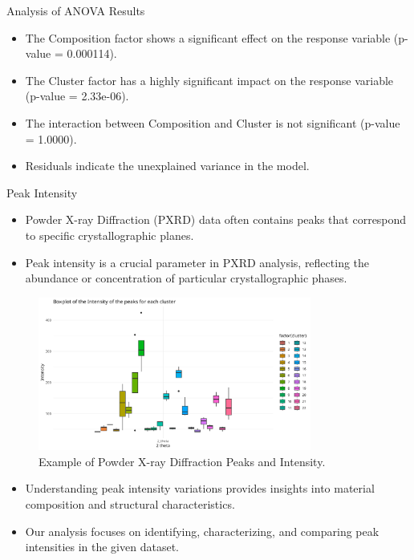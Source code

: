 \documentclass[aspectratio=169]{beamer}
\begin{document}
\begin{frame}{Analysis of ANOVA Results}
  \begin{itemize}
    \item The Composition factor shows a significant effect on the response variable (p-value = 0.000114).
    \item The Cluster factor has a highly significant impact on the response variable (p-value = 2.33e-06).
    \item The interaction between Composition and Cluster is not significant (p-value = 1.0000).
    \item Residuals indicate the unexplained variance in the model.
  \end{itemize}
\end{frame}


\begin{frame}{Peak Intensity}
    \begin{itemize}
        \item Powder X-ray Diffraction (PXRD) data often contains peaks that correspond to specific crystallographic planes.
        \item Peak intensity is a crucial parameter in PXRD analysis, reflecting the abundance or concentration of particular crystallographic phases.
    \end{itemize}

    \begin{figure}
        \includegraphics[width=0.8\textwidth]{../plot/intensity.png}
        \caption{Example of Powder X-ray Diffraction Peaks and Intensity.}
    \end{figure}

    \begin{itemize}
        \item Understanding peak intensity variations provides insights into material composition and structural characteristics.
        \item Our analysis focuses on identifying, characterizing, and comparing peak intensities in the given dataset.
    \end{itemize}
\end{frame}
\end{document}
